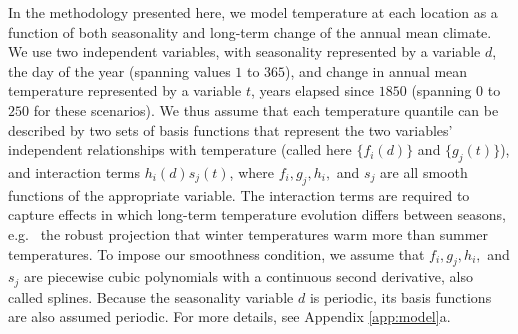\documentclass{ametsoc}
\begin{document}
In the methodology presented here, we 
model temperature at each location as a function of both seasonality and long-term change of the annual mean climate. %
We use two independent variables, with seasonality represented by a variable $d$, the day of the year (spanning values $1$ to $365$), and change in annual mean temperature represented by a variable $t$, years elapsed since $1850$ (spanning $0$ to $250$ for these scenarios).
We thus assume that each temperature quantile can be described by two sets of basis functions that represent the two variables' independent relationships with temperature (called here $\{f_i(d)\}$ and $\{g_j(t)\}$), and interaction terms $h_i(d)s_j(t)$, where 
$f_i, g_j, h_i,$ and $s_j$ are all smooth functions of the appropriate variable. %
The interaction terms are required to capture effects in which long-term temperature evolution differs between seasons, e.g.\
the robust projection that winter temperatures warm more than summer temperatures. 
To impose our smoothness condition, we assume that $f_i, g_j, h_i,$ and $s_j$ are piecewise cubic polynomials with a continuous second derivative, also called splines. \citep[For a review of cubic polynomial basis functions, see][Chapter 5.]{ESL}
Because the seasonality variable $d$ is periodic, its basis functions are also assumed periodic. 
For more details, see Appendix \ref{app:model}a.
\end{document}
